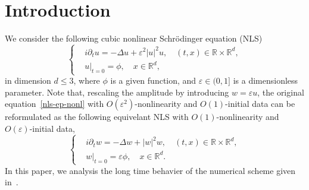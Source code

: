 \documentclass[10pt,a4paper]{article}
\begin{document}
  \section{Introduction}
  We consider the following cubic nonlinear Schr\"{o}dinger equation (NLS)
  \begin{equation}\label{nls-ep-nonl} %
    \left\{
    \begin{aligned}
      & i\partial_t u = -\Delta u + \varepsilon^2 |u|^2 u, \quad (t,x) \in
      \mathbb R\times\mathbb R^d, \\
      & u|_{t=0} = \phi, \quad x \in \mathbb R^d,
    \end{aligned}
    \right.
  \end{equation}
  in dimension \( d \leq 3 \), where \(\phi\) is a given function, and \(
  \varepsilon \in (0,1] \) is a dimensionless parameter.%
  Note that, rescaling the amplitude by introducing \(w = \varepsilon u\),
  the original equation~\eqref{nls-ep-nonl} with \(O(\varepsilon^2)\)-nonlinearity and 
  \(O(1)\)-initial data can be reformulated as the following equivelant NLS
  with \(O(1)\)-nonlinearity and \(O(\varepsilon)\)-initial data,
  \begin{equation}%
    \left\{
    \begin{aligned}
      & i\partial_t w = -\Delta w + |w|^2 w, \quad (t,x) \in
      \mathbb R\times\mathbb R^d, \\
      & w|_{t=0} = \varepsilon \phi, \quad x \in \mathbb R^d.
    \end{aligned}
    \right.
  \end{equation}
  In this paper, we analysis the long time behavier of the numerical scheme
  given in~\cite{ORS21}.
\end{document}
